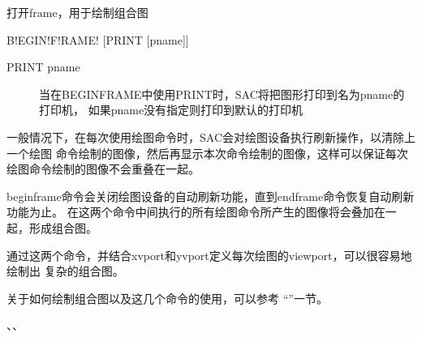 \label{cmd:beginframe}

打开frame，用于绘制组合图

\begin{SACSTX}
B!EGIN!F!RAME! [PRINT [pname]]
\end{SACSTX}

\begin{description}
\item [PRINT pname] 当在BEGINFRAME中使用PRINT时，SAC将把图形打印到名为pname的打印机，
    如果pname没有指定则打印到默认的打印机
\end{description}

一般情况下，在每次使用绘图命令时，SAC会对绘图设备执行刷新操作，以清除上一个绘图
命令绘制的图像，然后再显示本次命令绘制的图像，这样可以保证每次绘图命令绘制的图像不会重叠在一起。

beginframe命令会关闭绘图设备的自动刷新功能，直到endframe命令恢复自动刷新功能为止。
在这两个命令中间执行的所有绘图命令所产生的图像将会叠加在一起，形成组合图。

通过这两个命令，并结合xvport和yvport定义每次绘图的viewport，可以很容易地绘制出
复杂的组合图。

关于如何绘制组合图以及这几个命令的使用，可以参考 ``''一节。

、、
